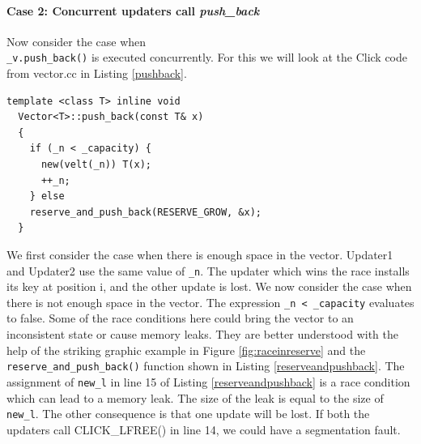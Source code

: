 \documentclass[a4paper,marginparwidth=50pt,marginparsep=10pt]{article}
\begin{document}
\paragraph{Case 2: Concurrent updaters call \emph{push\_back} }
Now consider the case when\\ \verb+_v.push_back()+ is executed concurrently. For this we will look at the Click code from vector.cc in Listing \ref{pushback}.
\begin{lstlisting}[caption = The push\_back() function, label=pushback]
  template <class T> inline void
  Vector<T>::push_back(const T& x)
  {
    if (_n < _capacity) {
      new(velt(_n)) T(x);
      ++_n;
    } else
    reserve_and_push_back(RESERVE_GROW, &x);
  }
\end{lstlisting}
We first consider the case when there is enough space in the vector. Updater1 and Updater2 use the same value of \verb+_n+. The updater which wins the race installs its key at position i, and the other update is lost.
We now consider the case when there is not enough space in the vector. The expression \verb$_n < _capacity$ evaluates to false. Some of the race conditions here could bring the vector to an inconsistent state or cause memory leaks. They are better understood with the help of the striking graphic example in Figure \ref{fig:raceinreserve} and the \verb+reserve_and_push_back()+ function shown in Listing \ref{reserveandpushback}. The assignment of \verb+new_l+ in line 15 of Listing \ref{reserveandpushback} is a race condition which can lead to a memory leak. The size of the leak is equal to the size of \verb+new_l+. The other consequence is that one update will be lost. If both the updaters call CLICK\_LFREE() in line 14, we could have a segmentation fault.
\end{document}
